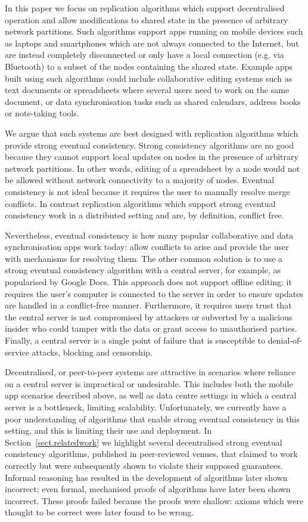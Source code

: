 \documentclass[acmlarge,review,anonymous]{acmart}\settopmatter{printfolios=true}
\begin{document}
In this paper we focus on replication algorithms which support decentralised operation and allow modifications to shared state in the presence of arbitrary network partitions.
Such algorithms support apps running on mobile devices such as laptops and smartphones which are not always connected to the Internet, but are instead completely disconnected or only have a local connection (e.g. via Bluetooth) to a subset of the nodes containing the shared state.
Example apps built using such algorithms could include collaborative editing systems such as text documents or spreadsheets where several users need to work on the same document, or data synchronisation tasks such as shared calendars, address books or note-taking tools.

We argue that such systems are best designed with replication algorithms which provide strong eventual consistency. Strong consistency algorithms are no good because they cannot support local updates on nodes in the presence of arbitrary network partitions.
In other words, editing of a spreadsheet by a node would not be allowed without network connectivity to a majority of nodes.
Eventual consistency is not ideal because it requires the user to manually resolve merge conflicts.
In contrast replication algorithms which support strong eventual consistency work in a distributed setting and are, by definition, conflict free.

Nevertheless, eventual consistency is how many popular collaborative and data synchronisation apps work today: allow
conflicts to arise and provide the user with mechanisms for resolving them.
The other common solution is to use a strong eventual consistency algorithm with a central server, for example, as popularised by Google Docs.
This approach does not support offline editing: it requires the user's computer is connected to the server in order to ensure updates are handled in a conflict-free manner.
Furthermore, it requires users trust that the central server is not compromised by attackers or subverted by a malicious insider who could tamper with the data or grant access to unauthorised parties.
Finally, a central server is a single point of failure that is susceptible to denial-of-service attacks, blocking and censorship.

Decentralised, or peer-to-peer systems are attractive in scenarios where reliance on a central server is impractical or undesirable.
This includes both the mobile app scenarios described above, as well as data centre settings in which a central server is a bottleneck, limiting scalability.
Unfortunately, we currently have a poor understanding of algorithms that enable strong eventual consistency in this setting, and this is limiting their use and deployment.
In Section~\ref{sect.relatedwork} we highlight several decentralised strong eventual consistency algorithms, published in peer-reviewed venues, that claimed to work correctly but were subsequently shown to violate their supposed guarantees. 
Informal reasoning has resulted in the development of algorithms later shown incorrect; even formal, mechanised proofs of algorithms have later been shown incorrect.
These proofs failed because the proofs were shallow: axioms which were thought to be correct were later found to be wrong.
\end{document}

